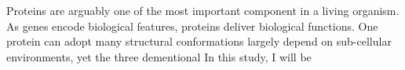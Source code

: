 Proteins are arguably one of the most important component in a living organism. As genes encode biological features, proteins deliver biological functions. One protein can adopt many structural conformations largely depend on sub-cellular environments, yet the three dementional      In this study, I will be 